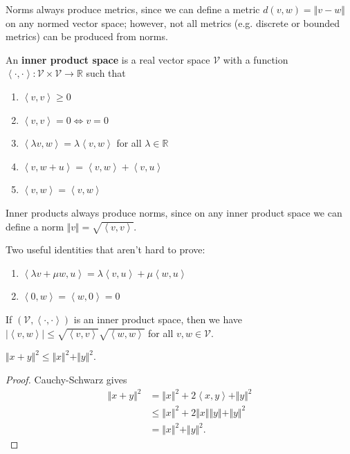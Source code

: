 \documentclass[10pt]{report}
\begin{document}
Norms always produce metrics, since we can define a metric $d(v,w)=\Vert{v-w}\Vert$ on any normed vector space; however, not all metrics (e.g. discrete or bounded metrics) can be produced from norms.

\begin{defn}[]
	An \textbf{inner product space} is a real vector space $\mathcal{V}$ with a function $\left\langle \cdot,\cdot \right\rangle:\mathcal{V}\times\mathcal{V}\to\mathbb{R}$ such that
	\begin{enumerate}
		\item $\left\langle v,v \right\rangle\geq 0$ 
		\item $\left\langle v,v \right\rangle=0 \iff v=0$ 
		\item $\left\langle \lambda v,w \right\rangle= \lambda \left\langle v,w \right\rangle$ for all $\lambda \in \mathbb{R}$ 
		\item $\left\langle v,w+u \right\rangle=\left\langle v,w \right\rangle+\left\langle v,u \right\rangle$ 
		\item $\left\langle v,w \right\rangle=\left\langle v,w \right\rangle$
	\end{enumerate}
\end{defn}

Inner products always produce norms, since on any inner product space we can define a norm $\Vert{v}\Vert=\sqrt{\left\langle v,v \right\rangle}$.

Two useful identities that aren't hard to prove:
\begin{enumerate}
	\item $\left\langle \lambda v + \mu w, u \right\rangle=\lambda \left\langle v,u \right\rangle+\mu\left\langle w,u \right\rangle$ 
	\item $\left\langle 0,w \right\rangle=\left\langle w,0 \right\rangle=0$
\end{enumerate}

\begin{prop}
	If $(\mathcal{V},\left\langle \cdot,\cdot \right\rangle)$ is an inner product space, then we have $|\left\langle v,w \right\rangle| \leq \sqrt{\left\langle v,v \right\rangle} \sqrt{\left\langle w,w \right\rangle}$ for all $v,w \in \mathcal{V}$.
\end{prop}

\begin{prop}
	$\Vert{x+y}\Vert^2 \leq \Vert{x}\Vert^2 + \Vert{y}\Vert^2$.
\end{prop}
\begin{proof}
	Cauchy-Schwarz gives
	\begin{align*}
		\Vert{x+y}\Vert^2 &= \Vert{x}\Vert^2 + 2\left\langle x,y \right\rangle + \Vert{y}\Vert^2 \\
				  &\leq \Vert{x}\Vert^2 + 2\Vert{x}\Vert\Vert{y}\Vert + \Vert{y}\Vert^2 \\
				  &= \Vert{x}\Vert^2 + \Vert{y}\Vert^2.
	\end{align*}
\end{proof}
\end{document}
